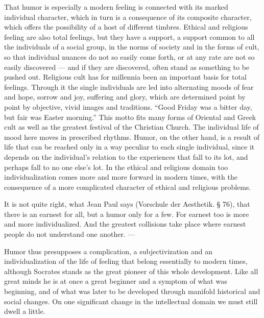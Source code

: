 \documentclass[12pt]{book}
\newcommand{\opage}[1]{\marginnote{\footnotesize\textit{[#1]}}}
\begin{document}
That humor is especially a modern feeling is connected with its marked individual character,
which in turn is a consequence of its composite character, which offers the possibility of a
host of different timbres. Ethical and religious feeling are also total feelings, but they
have a support, a support common to all the individuals of a social group, in the norms of
society and in the forms of cult, so that individual nuances do not so easily come forth, or
at any rate are not so easily discovered --- and if they are discovered, often stand as
something to be pushed out. Religious cult has for millennia been an important basis for total
feelings. Through it the single individuals are led into alternating moods of fear and hope,
sorrow and joy, suffering and glory, which are determined point by point by objective, vivid
images and traditions. ``Good Friday was a bitter day, but fair was Easter morning.'' This
motto fits many forms of Oriental and Greek cult as well as the greatest festival of the
Christian Church. The individual life of mood here moves in prescribed rhythms. Humor, on the
other hand, is a result of life that can be reached only in a way peculiar to each single
individual, since it depends on the individual's relation to the experiences that fall to its
lot, and perhaps fall to no one else's lot. In the ethical and religious domain too
individualization comes more and more forward in modern times, with the consequence of a more
complicated character of ethical and religious problems.

It is not quite right, what Jean Paul says (Vorschule der Aesthetik. § 76), that there is an
earnest for all, but a humor only for a few. For earnest too is more and more individualized.
And the greatest collisions take place where earnest people do not understand one another. ---

\opage{142}Humor thus presupposes a complication, a subjectivization and an individualization
of the life of feeling that belong essentially to modern times, although Socrates stands as
the great pioneer of this whole development. Like all great minds he is at once a great
beginner and a symptom of what was beginning, and of what was later to be developed through
manifold historical and social changes. On one significant change in the intellectual domain
we must still dwell a little.
\end{document}
